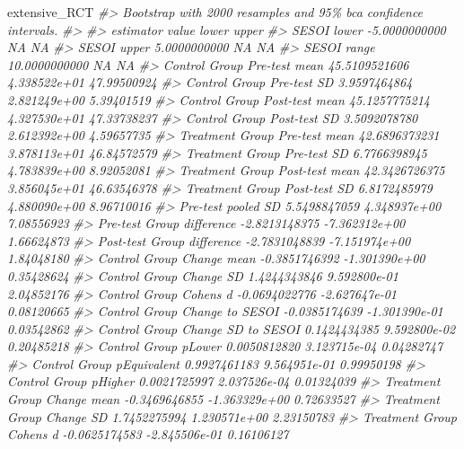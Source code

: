 \documentclass[
]{book}
\newenvironment{Shaded}{\begin{snugshade}}{\end{snugshade}}
\newcommand{\CommentTok}[1]{\textcolor[rgb]{0.56,0.35,0.01}{\textit{#1}}}
\newcommand{\NormalTok}[1]{#1}
\begin{document}
\begin{Shaded}
\begin{Highlighting}[]
\NormalTok{extensive\_RCT}
\CommentTok{\#> Bootstrap with 2000 resamples and 95\% bca confidence intervals.}
\CommentTok{\#> }
\CommentTok{\#>                           estimator         value         lower        upper}
\CommentTok{\#>                         SESOI lower {-}5.0000000000            NA           NA}
\CommentTok{\#>                         SESOI upper  5.0000000000            NA           NA}
\CommentTok{\#>                         SESOI range 10.0000000000            NA           NA}
\CommentTok{\#>         Control Group Pre{-}test mean 45.5109521606  4.338522e+01  47.99500924}
\CommentTok{\#>           Control Group Pre{-}test SD  3.9597464864  2.821249e+00   5.39401519}
\CommentTok{\#>        Control Group Post{-}test mean 45.1257775214  4.327530e+01  47.33738237}
\CommentTok{\#>          Control Group Post{-}test SD  3.5092078780  2.612392e+00   4.59657735}
\CommentTok{\#>       Treatment Group Pre{-}test mean 42.6896373231  3.878113e+01  46.84572579}
\CommentTok{\#>         Treatment Group Pre{-}test SD  6.7766398945  4.783839e+00   8.92052081}
\CommentTok{\#>      Treatment Group Post{-}test mean 42.3426726375  3.856045e+01  46.63546378}
\CommentTok{\#>        Treatment Group Post{-}test SD  6.8172485979  4.880090e+00   8.96710016}
\CommentTok{\#>                  Pre{-}test pooled SD  5.5498847059  4.348937e+00   7.08556923}
\CommentTok{\#>           Pre{-}test Group difference {-}2.8213148375 {-}7.362312e+00   1.66624873}
\CommentTok{\#>          Post{-}test Group difference {-}2.7831048839 {-}7.151974e+00   1.84048180}
\CommentTok{\#>           Control Group Change mean {-}0.3851746392 {-}1.301390e+00   0.35428624}
\CommentTok{\#>             Control Group Change SD  1.4244343846  9.592800e{-}01   2.04852176}
\CommentTok{\#>             Control Group Cohen\textquotesingle{}s d {-}0.0694022776 {-}2.627647e{-}01   0.08120665}
\CommentTok{\#>       Control Group Change to SESOI {-}0.0385174639 {-}1.301390e{-}01   0.03542862}
\CommentTok{\#>    Control Group Change SD to SESOI  0.1424434385  9.592800e{-}02   0.20485218}
\CommentTok{\#>                Control Group pLower  0.0050812820  3.123715e{-}04   0.04282747}
\CommentTok{\#>           Control Group pEquivalent  0.9927461183  9.564951e{-}01   0.99950198}
\CommentTok{\#>               Control Group pHigher  0.0021725997  2.037526e{-}04   0.01324039}
\CommentTok{\#>         Treatment Group Change mean {-}0.3469646855 {-}1.363329e+00   0.72633527}
\CommentTok{\#>           Treatment Group Change SD  1.7452275994  1.230571e+00   2.23150783}
\CommentTok{\#>           Treatment Group Cohen\textquotesingle{}s d {-}0.0625174583 {-}2.845506e{-}01   0.16106127}

\end{Highlighting}
\end{Shaded}
\end{document}
